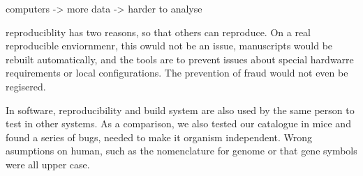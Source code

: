 computers -> more data -> harder to analyse



reproduciblity has two reasons, so that others can reproduce.  On a
real reproducible enviornmenr, this owuld not be an issue, manuscripts
would be rebuilt automatically, and the tools are to prevent issues
about special hardwarre requirements or local configurations.  The
prevention of fraud would not even be regisered.

In software, reproducibility and build system are also used by the
same person to test in other systems.  As a comparison, we also tested
our catalogue in mice and found a series of bugs, needed to make it
organism independent.  Wrong asumptions on human, such as the
nomenclature for genome or that gene symbols were all upper case.

